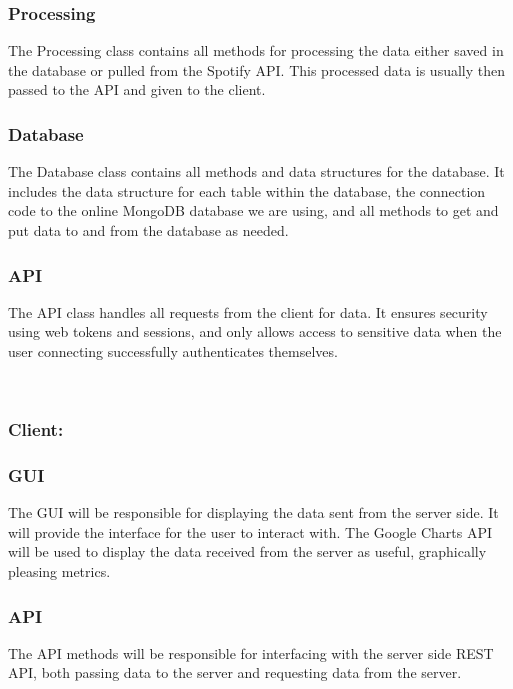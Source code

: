 \documentclass[10pt, notitlepage]{report}
\begin{document}
\subsubsection{Processing}
The Processing class contains all methods for processing the data either saved in the database or pulled from the Spotify API. This processed data is usually then passed to the API and given to the client.

\subsubsection{Database}
The Database class contains all methods and data structures for the database. It includes the data structure for each table within the database, the connection code to the online MongoDB database we are using, and all methods to get and put data to and from the database as needed.

\subsubsection{API}
The API class handles all requests from the client for data. It ensures security using web tokens and sessions, and only allows access to sensitive data when the user connecting successfully authenticates themselves.  


\leavevmode \\

\subsubsection{Client:}

\hrulefill

\subsubsection{GUI}
The GUI will be responsible for displaying the data sent from the server side. It will provide the interface for the user to interact with. The Google Charts API will be used to display the data received from the server as useful, graphically pleasing metrics.

\subsubsection{API}
The API methods will be responsible for interfacing with the server side REST API, both passing data to the server and requesting data from the server.
\end{document}
